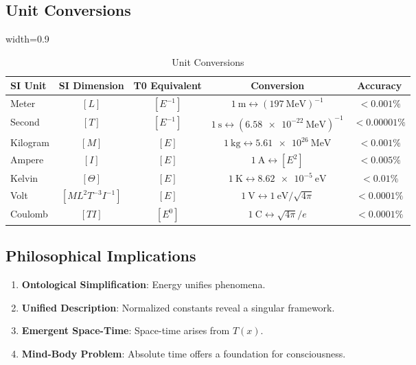 \documentclass[12pt,a4paper]{article}
\newcommand{\Tfield}{T(x)}
\newcommand{\tablescale}{0.9}
\begin{document}
	\subsection{Unit Conversions}
	\label{sec:conversions}
	
	\begin{table}[htbp]
		\centering
		\begin{adjustbox}{width=\tablescale\textwidth}
			\begin{tabular}{lcccc}
				\toprule
				\textbf{SI Unit} & \textbf{SI Dimension} & \textbf{T0 Equivalent} & \textbf{Conversion} & \textbf{Accuracy} \\
				\midrule
				Meter & \([L]\) & \([E^{-1}]\) & \(\SI{1}{\meter} \leftrightarrow (\SI{197}{\mega\electronvolt})^{-1}\) & \(< 0.001\%\) \\
				Second & \([T]\) & \([E^{-1}]\) & \(\SI{1}{\second} \leftrightarrow (\SI{6.58e-22}{\mega\electronvolt})^{-1}\) & \(< 0.00001\%\) \\
				Kilogram & \([M]\) & \([E]\) & \(\SI{1}{\kilogram} \leftrightarrow \SI{5.61e26}{\mega\electronvolt}\) & \(< 0.001\%\) \\
				Ampere & \([I]\) & \([E]\) & \(\SI{1}{\ampere} \leftrightarrow [E^2]\) & \(< 0.005\%\) \\
				Kelvin & \([\Theta]\) & \([E]\) & \(\SI{1}{\kelvin} \leftrightarrow \SI{8.62e-5}{\electronvolt}\) & \(< 0.01\%\) \\
				Volt & \([ML^2 T^{-3} I^{-1}]\) & \([E]\) & \(\SI{1}{\volt} \leftrightarrow \SI{1}{\electronvolt}/\sqrt{4\pi}\) & \(< 0.0001\%\) \\
				Coulomb & \([T I]\) & \([E^0]\) & \(\SI{1}{\coulomb} \leftrightarrow \sqrt{4\pi}/e\) & \(< 0.0001\%\) \\
				\bottomrule
			\end{tabular}
		\end{adjustbox}
		\caption{Unit Conversions}
		\label{tab:conversion}
	\end{table}
	
	\subsection{Philosophical Implications}
	\label{sec:philosophy}
	
	\begin{enumerate}
		\item \textbf{Ontological Simplification}: Energy unifies phenomena.
		\item \textbf{Unified Description}: Normalized constants reveal a singular framework.
		\item \textbf{Emergent Space-Time}: Space-time arises from \(\Tfield\).
		\item \textbf{Mind-Body Problem}: Absolute time offers a foundation for consciousness.
	\end{enumerate}
	
\end{document}
